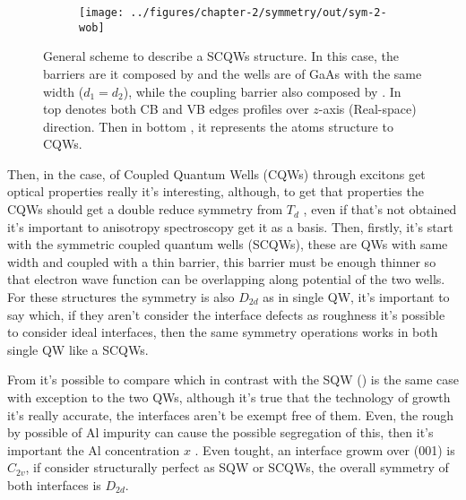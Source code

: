 \begin{figure}[h!]
	\centering
	\begin{subfigure}{\textwidth}
		\texttt{[image: ../figures/chapter-2/symmetry/out/sym-2-wob]}
		\label{subfig:subsubsec:chapter-2-scoupled-quantum-wells-a}
		\label{subfig:subsubsec:chapter-2-scoupled-quantum-wells-b}
	\end{subfigure}
	\caption[CB,VB]
	{
		General scheme to describe a \gls{SCQWs} structure. In this case, the barriers are it composed by \algaas and the wells are of GaAs with the same width ($d_{1}=d_{2}$), while the coupling barrier also composed by \algaas. In top  denotes both  \gls{CB} and   \gls{VB}  edges profiles over $z$-axis (Real-space) direction. Then in bottom , it represents the atoms structure to CQWs. 
	}\label{fig:subsubsec:chapter-2-scoupled-quantum-wells}
\end{figure}

Then, in the case, of Coupled Quantum Wells (\gls{CQWs}) through excitons get optical properties really it's interesting, although, to get that properties the CQWs should get a double reduce symmetry from $T_{d}$ , even if that's not obtained it's important to anisotropy spectroscopy get it as a basis. 
Then, firstly, it's start with the symmetric coupled quantum wells (\gls{SCQWs}), these are QWs with same width and coupled with a thin barrier, this barrier must be enough thinner so that electron wave function can be overlapping along potential of the two wells. 
For these structures the symmetry is also $D_{2d}$ as in single QW, it's important to say which, if they aren't  consider the  interface defects as roughness it's possible to consider  ideal interfaces, then the same symmetry operations works in both single QW like a SCQWs. 

From  it's possible to compare which in contrast with the SQW () is the same case with exception to the two QWs, although it's true that the technology of growth it's really accurate, the interfaces aren't be exempt  free of them. Even, the rough by possible of Al impurity can cause the possible segregation of this, then it's important the Al concentration $x$ \cite{chand1990origin,tillmann2002direct}. Even tought, an interface growm over (001) is $C_{2v}$, if consider structurally perfect as \gls{SQW} or \gls{SCQWs}, the overall symmetry of both interfaces is $D_{2d}$\cite{magri2000anticrossing}.

